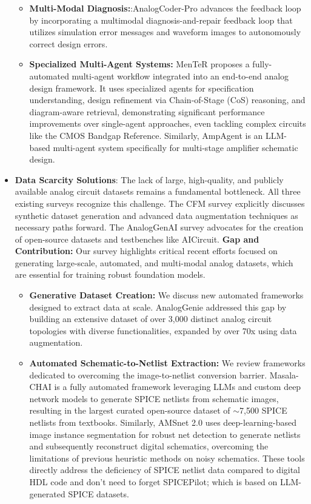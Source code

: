 \documentclass{ieeeaccess}
\begin{document}
\begin{itemize}
	      \begin{itemize}
		      \item \textbf{Multi-Modal Diagnosis:}:AnalogCoder-Pro advances the feedback loop by incorporating a multimodal diagnosis-and-repair feedback loop that utilizes simulation error messages and waveform images to autonomously correct design errors.
		      \item \textbf{Specialized Multi-Agent Systems:} MenTeR proposes a fully-automated multi-agent workflow integrated into an end-to-end analog design framework. It uses specialized agents for specification understanding, design refinement via Chain-of-Stage (CoS) reasoning, and diagram-aware retrieval, demonstrating significant performance improvements over single-agent approaches, even tackling complex circuits like the CMOS Bandgap Reference. Similarly, AmpAgent is an LLM-based multi-agent system specifically for multi-stage amplifier schematic design.
	      \end{itemize}
	\item \textbf{Data Scarcity Solutions}: The lack of large, high-quality, and publicly available analog circuit datasets remains a fundamental bottleneck.
	      \newline
	      All three existing surveys recognize this challenge. The CFM survey explicitly discusses synthetic dataset generation and advanced data augmentation techniques as necessary paths forward. The AnalogGenAI survey advocates for the creation of open-source datasets and testbenches like AICircuit.
	      \newline
	      \textbf{Gap and Contribution:} Our survey highlights critical recent efforts focused on generating large-scale, automated, and multi-modal analog datasets, which are essential for training robust foundation models.
	      \begin{itemize}
		      \item \textbf{Generative Dataset Creation:} We discuss new automated frameworks designed to extract data at scale. AnalogGenie addressed this gap by building an extensive dataset of over 3,000 distinct analog circuit topologies with diverse functionalities, expanded by over 70x using data augmentation.
		      \item \textbf{Automated Schematic-to-Netlist Extraction:} We review frameworks dedicated to overcoming the image-to-netlist conversion barrier. Masala-CHAI is a fully automated framework leveraging LLMs and custom deep network models to generate SPICE netlists from schematic images, resulting in the largest curated open-source dataset of $\sim$7,500 SPICE netlists from textbooks. Similarly, AMSnet 2.0 uses deep-learning-based image instance segmentation for robust net detection to generate netlists and subsequently reconstruct digital schematics, overcoming the limitations of previous heuristic methods on noisy schematics. These tools directly address the deficiency of SPICE netlist data compared to digital HDL code and don't need to forget SPICE\-Pilot; which is based on LLM-generated SPICE datasets.
	      \end{itemize}
\end{itemize}
\end{document}
